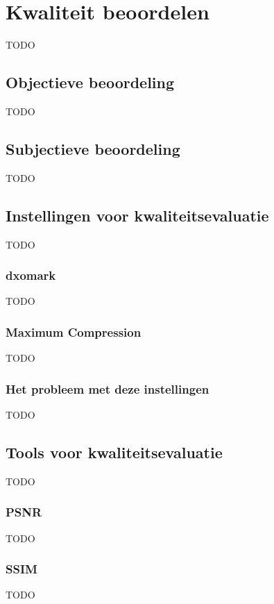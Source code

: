 \chapter{Kwaliteit beoordelen}
\label{ch:kwaliteit}

TODO

\section{Objectieve beoordeling}
\label{sec:kwaliteit-objectief}

TODO

\section{Subjectieve beoordeling}
\label{sec:kwaliteit-subjectief}

TODO

\section{Instellingen voor kwaliteitsevaluatie}
\label{sec:kwaliteit-bedrijven}

TODO

\subsection{dxomark}
\label{sec:kwaliteit-dxomark}

TODO

\subsection{Maximum Compression}
\label{sec:kwaliteit-maximum-compression}

TODO

\subsection{Het probleem met deze instellingen}
\label{sec:kwaliteit-maximum-probleem}

TODO

\section{Tools voor kwaliteitsevaluatie}
\label{sec:kwaliteit-tools}

TODO

\subsection{PSNR}
\label{sec:kwaliteit-psnr}

TODO

\subsection{SSIM}
\label{sec:kwaliteit-ssim}

TODO

